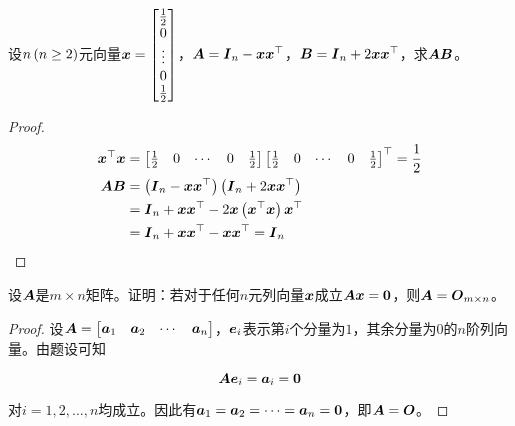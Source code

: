 \begin{problem}
设\(n\left( n\ge2 \right)\)元向量\(\boldsymbol{x}=\begin{bmatrix}\frac12\\0\\\vdots\\0\\\frac12\end{bmatrix}\)，\(\boldsymbol{A}=\boldsymbol{I}_n-\boldsymbol{x}\boldsymbol{x}^\top\)，\(\boldsymbol{B}=\boldsymbol{I}_n+2\boldsymbol{x}\boldsymbol{x}^\top\)，求\(\boldsymbol{A}\boldsymbol{B}\)。
\end{problem}
\begin{proof}
    \begin{align*}
        \boldsymbol{x}^\top\boldsymbol{x} & =
        \begin{bmatrix}
            \frac{1}{2} & 0 & \cdots & 0 & \frac{1}{2}
        \end{bmatrix}
        \begin{bmatrix}
            \frac{1}{2} & 0 & \cdots & 0 & \frac{1}{2}
        \end{bmatrix}^\top=\frac{1}{2}                                         \\
        \boldsymbol{A}\boldsymbol{B}      & =\left( \boldsymbol{I}_n-\boldsymbol{x}\boldsymbol{x}^\top \right)\left( \boldsymbol{I}_n+2\boldsymbol{x}\boldsymbol{x}^\top \right) \\
                        & =\boldsymbol{I}_n+\boldsymbol{x}\boldsymbol{x}^\top-2\boldsymbol{x}\left( \boldsymbol{x}^\top\boldsymbol{x} \right)\boldsymbol{x}^\top \\
                        & =\boldsymbol{I}_n+\boldsymbol{x}\boldsymbol{x}^\top-\boldsymbol{x}\boldsymbol{x}^\top=\boldsymbol{I}_n
    \end{align*}
\end{proof}

\begin{problem}
设\(\boldsymbol{A}\)是\(m\times n\)矩阵。证明：若对于任何\(n\)元列向量\(\boldsymbol{x}\)成立\(\boldsymbol{A}\boldsymbol{x}=\boldsymbol{0}\)，则\(\boldsymbol{A}=\boldsymbol{O}_{m\times n}\)。
\end{problem}
\begin{proof}
    设\(\boldsymbol{A}=\begin{bmatrix}\boldsymbol{a}_1&\boldsymbol{a}_2&\cdots&\boldsymbol{a}_n\end{bmatrix}\)，\(\boldsymbol{e}_i\)表示第\(i\)个分量为\(1\)，其余分量为\(0\)的\(n\)阶列向量。由题设可知

    \begin{equation*}
        \boldsymbol{A}\boldsymbol{e}_i=\boldsymbol{a}_i=\boldsymbol{0}
    \end{equation*}

    对\(i=1,2,\dots,n\)均成立。因此有\(\boldsymbol{a}_1=\boldsymbol{a}_2=\cdots=\boldsymbol{a}_n=\boldsymbol{0}\)，即\(\boldsymbol{A}=\boldsymbol{O}\)。
\end{proof}

